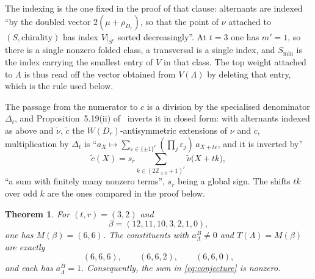 \documentclass[11pt]{amsart}
\newtheorem{theorem}{Theorem}
\theoremstyle{remark}
\begin{document}
The indexing is the one fixed in the proof of that clause: alternants are
indexed ``by the doubled vector $2(\mu+\rho_{D_r})$, so that the point of
$\nu$ attached to $(S,\text{chirality})$ has index $V|_{S^{\mathrm c}}$
sorted decreasingly''. At $t=3$ one has $m'=1$, so there is a single
nonzero folded class, a transversal is a single index, and $S_{\min}$ is
the index carrying the smallest entry of $V$ in that class. The top weight
attached to $\Lambda$ is thus read off the vector obtained from $V(\Lambda)$
by deleting that entry, which is the rule used below.

The passage from the numerator to $c$ is a division by the specialised
denominator $\Delta_t$, and Proposition~5.19(ii) of~\cite{Marin} inverts it
in closed form: with alternants indexed as above and $\tilde\nu$,
$\tilde c$ the $W(D_r)$-antisymmetric extensions of $\nu$ and $c$,
multiplication by $\Delta_t$ is
``$a_X\mapsto\sum_{\varepsilon\in\{\pm1\}^r}
(\prod_j\varepsilon_j)\,a_{X+t\varepsilon}$, and it is inverted by''
\[
\tilde c(X)=s_r\!\!\sum_{k\in(2\mathbb{Z}_{\ge0}+1)^r}\!\!
\tilde\nu\bigl(X+tk\bigr),
\]
``a sum with finitely many nonzero terms'', $s_r$ being a global sign. The
shifts $tk$ over odd $k$ are the ones compared in the proof below.

\begin{theorem}
For $(t,r)=(3,2)$ and
\[
\beta=(12,11,10,3,2,1,0),
\]
one has $M(\beta)=(6,6)$. The constituents with
$a^B_\Lambda\ne0$ and $T(\Lambda)=M(\beta)$ are exactly
\[
(6,6,6),\qquad (6,6,2),\qquad (6,6,0),
\]
and each has $a^B_\Lambda=1$. Consequently, the sum in
\eqref{eq:conjecture} is nonzero.
\end{theorem}
\end{document}
